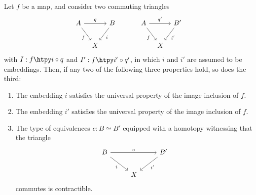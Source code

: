 \begin{thm}\label{thm:uniqueness-image}
  Let $f$ be a map, and consider two commuting triangles
  \begin{equation*}
    \begin{tikzcd}[column sep=tiny]
      A \arrow[dr,swap,"f"] \arrow[rr,"q"] & & B \arrow[dl,"i"] &[2em] A \arrow[dr,swap,"f"] \arrow[rr,"{q'}"] & & B' \arrow[dl,"{i'}"] \\
      \phantom{B'} & X & \phantom{B'} & \phantom{B'} & X
    \end{tikzcd}
  \end{equation*}
  with $I:f\htpy i\circ q$ and $I':f\htpy i'\circ q'$, in which $i$ and $i'$ are assumed to be embeddings. Then, if any two of the following three properties hold, so does the third:
  \begin{enumerate}
  \item The embedding $i$ satisfies the universal property of the image inclusion of $f$.
  \item The embedding $i'$ satisfies the universal property of the image inclusion of $f$.
  \item The type of equivalences $e:B\simeq B'$ equipped with a homotopy witnessing that the triangle
    \begin{equation*}
      \begin{tikzcd}
        B \arrow[dr,swap,"i"] \arrow[rr,"e"] & & B' \arrow[dl,"{i'}"] \\
        \phantom{B'} & X
      \end{tikzcd}
    \end{equation*}
    commutes is contractible.
  \end{enumerate}
\end{thm}

